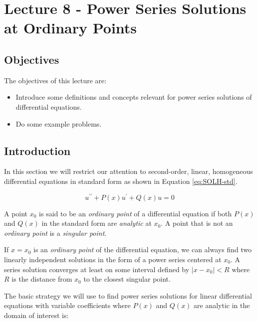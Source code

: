 \chapter{Lecture 8 - Power Series Solutions at Ordinary Points}
\label{ch:lec8}
\section{Objectives}
The objectives of this lecture are:
\begin{itemize}
\item Introduce some definitions and concepts relevant for power series solutions of differential equations.
\item Do some example problems.
\end{itemize}

\section{Introduction}
In this section we will restrict our attention to second-order, linear, homogeneous differential equations in standard form as shown in Equation \ref{eq:SOLH-std}.

\begin{equation}
u^{\prime \prime}+P(x)u^{\prime}+Q(x)u=0
\label{eq:SOLH-std}
\end{equation}

 
\begin{definition}
A point $x_0$ is said to be an \emph{ordinary point} of a differential equation if both $P(x)$ and $Q(x)$ in the standard form are \emph{analytic} at $x_0$.  A point that is not an \emph{ordinary point} is a \emph{singular point}.
\end{definition}


\begin{theorem}
If $x=x_0$ is an \emph{ordinary point} of the differential equation, we can always find two linearly independent solutions in the form of a power series centered at $x_0$.  A series solution converges at least on some interval defined by $\left| x - x_0 \right|<R$ where $R$ is the distance from $x_0$ to the closest singular point.
\end{theorem}

The basic strategy we will use to find power series solutions for linear differential equations with variable coefficients where $P(x)$ and $Q(x)$ are analytic in the domain of interest is:

